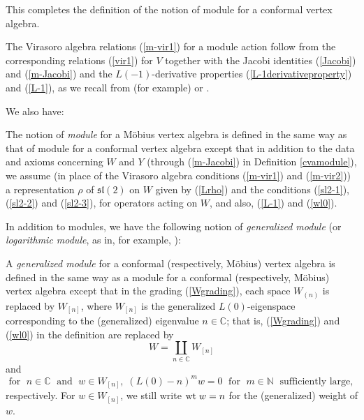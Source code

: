 \documentclass[12pt]{article}
\begin{document}
This completes the definition of the notion of module for a conformal
vertex algebra.

\begin{rema}\label{virrelationsformodule}{\rm
The Virasoro algebra relations (\ref{m-vir1}) for a module action follow
{}from the corresponding relations (\ref{vir1}) for $V$ together with the
Jacobi identities (\ref{Jacobi}) and (\ref{m-Jacobi}) and the
$L(-1)$-derivative properties (\ref{L-1derivativeproperty}) and
(\ref{L-1}), as we recall {}from (for example) \cite{FHL} or \cite{LL}.}
\end{rema}

We also have:

\begin{defi}\label{moduleMobius}{\rm
The notion of {\it module} for a M\"obius vertex algebra is defined in
the same way as that of module for a conformal vertex algebra except
that in addition to the data and axioms concerning $W$ and $Y$
(through (\ref{m-Jacobi}) in Definition \ref{cvamodule}), we assume
(in place of the Virasoro algebra conditions (\ref{m-vir1}) and
(\ref{m-vir2})) a representation $\rho$ of ${\mathfrak s}{\mathfrak l}(2)$ on
$W$ given by (\ref{Lrho}) and the conditions (\ref{sl2-1}),
(\ref{sl2-2}) and (\ref{sl2-3}), for operators acting on $W$, and
also, (\ref{L-1}) and (\ref{wl0}).  }
\end{defi}

In addition to modules, we have the following notion of {\em
generalized module} (or {\em logarithmic module}, as in, for example,
\cite{Mi}):

\begin{defi}\label{definitionofgeneralizedmodule}{\rm
A {\it generalized module} for a conformal (respectively, M\"obius)
vertex algebra is defined in the same way as a module for a conformal
(respectively, M\"obius) vertex algebra except that in the grading
(\ref{Wgrading}), each space $W_{(n)}$ is replaced by $W_{[n]}$, where
$W_{[n]}$ is the generalized $L(0)$-eigenspace corresponding to the
(generalized) eigenvalue $n\in {\mathbb C}$; that is, (\ref{Wgrading})
and (\ref{wl0}) in the definition are replaced by
\begin{equation}\label{Wgeneralizedgrading}
W=\coprod_{n\in{\mathbb C}} W_{[n]}
\end{equation}
and
\begin{equation}\label{gerwt}
\mbox{for }\;n\in {\mathbb C}\;\mbox{ and }\;w\in W_{[n]},\;
(L(0)-n)^mw=0 \;\mbox{ for }\;m\in {\mathbb N}\;\mbox{ sufficiently
large},
\end{equation}
respectively.  For $w \in W_{[n]}$, we still write $\mbox{\rm wt}\; w = n$ for the
(generalized) weight of $w$. }
\end{defi}
\end{document}
